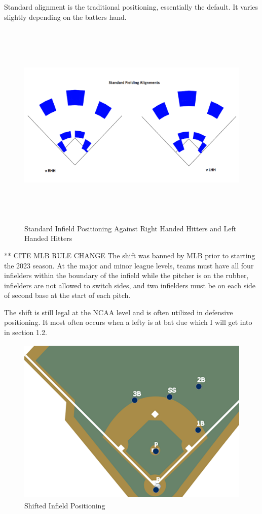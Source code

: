 \documentclass{article}
\begin{document}
\vspace{1cm}
Standard alignment is the traditional positioning, essentially the default. It varies slightly depending on the batters hand. 
\vspace{1.5cm}

\begin{figure}[h] 
    \centering  
    \includegraphics[height=10cm]{images/standard.png}
    \caption{Standard Infield Positioning Against Right Handed Hitters and Left Handed Hitters}
\end{figure}

\vspace{1.5cm}


** CITE MLB RULE CHANGE
The shift was banned by MLB prior to starting the 2023 season. At the major and minor league levels, teams must have all four infielders within the boundary of the infield while the pitcher is on the rubber, infielders are not allowed to switch sides, and two infielders must be on each side of second base at the start of each pitch.

The shift is still legal at the NCAA level and is often utilized in defensive positioning. It most often occurs when a lefty is at bat due which I will get into in section 1.2. 

\vspace{1.5cm}
\begin{figure}[h]
    \centering        
    \includegraphics[height=8cm]{images/shift.png}
    \caption{Shifted Infield Positioning}
\end{figure}
\vspace{1.5cm}
\newpage
\end{document}
